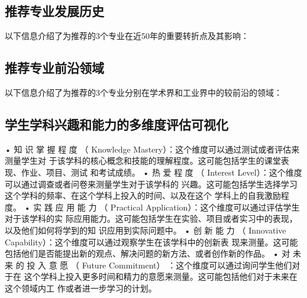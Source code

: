 \documentclass[12pt]{article}
\newcommand{\insertname}{
}
\begin{document}
\begin{CJK*}{UTF8}{gbsn}
   \newpage
   \subsection*{推荐专业发展历史}
   以下信息介绍了为推荐的3个专业在近50年的重要转折点及其影响：

   \newpage
   \subsection*{推荐专业前沿领域}
   以下信息介绍了为推荐的3个专业分别在学术界和工业界中的较前沿的领域：

   \newpage
   \subsection*{学生学科兴趣和能力的多维度评估可视化}
   • 知 识 掌 握 程 度 （ Knowledge Mastery）：这个维度可以通过测试或者评估来测量学生对
   于该学科的核心概念和技能的理解程度。这可能包括学生的课堂表现、作业、项目、测试
   和考试成绩。
   • 热 爱 程 度 （ Interest Level）：这个维度可以通过调查或者问卷来测量学生对于该学科的
   兴趣。这可能包括学生选择学习这个学科的频率、在这个学科上投入的时间、以及在这个
   学科上的自我激励程度。
   • 实 践 应 用 能 力 （ Practical Application）：这个维度可以通过评估学生对于该学科的实
   际应用能力。这可能包括学生在实验、项目或者实习中的表现，以及他们如何将学到的知
   识应用到实际问题中。
   • 创 新 能 力 （ Innovative Capability）：这个维度可以通过观察学生在该学科中的创新表
   现来测量。这可能包括他们是否能提出新的观点、解决问题的新方法、或者创作新的作品。
   • 对 未 来 的 投 入 意 愿 （ Future Commitment） ：这个维度可以通过询问学生他们对于在
   这个学科上投入更多时间和精力的意愿来测量。这可能包括他们对于未来在这个领域内工
   作或者进一步学习的计划。

   
   
   

\end{CJK*}
\end{document}
